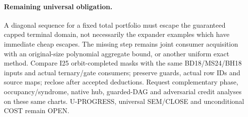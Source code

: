 \documentclass[11pt]{article}
\begin{document}
\paragraph{Remaining universal obligation.}
A diagonal sequence for a fixed total portfolio must escape the guaranteed capped terminal domain, not necessarily the expander examples which have immediate cheap escapes. The missing step remains joint consumer acquisition with an original-size polynomial aggregate bound, or another uniform exact method. Compare I25 orbit-completed masks with the same BD18/MS24/BH18 inputs and actual ternary/gate consumers; preserve guards, actual row IDs and source maps; reclose after accepted deductions. Request complementary phase, occupancy/syndrome, native hub, guarded-DAG and adversarial credit analyses on these same charts. U-PROGRESS, universal SEM/CLOSE and unconditional COST remain OPEN.
\end{document}
